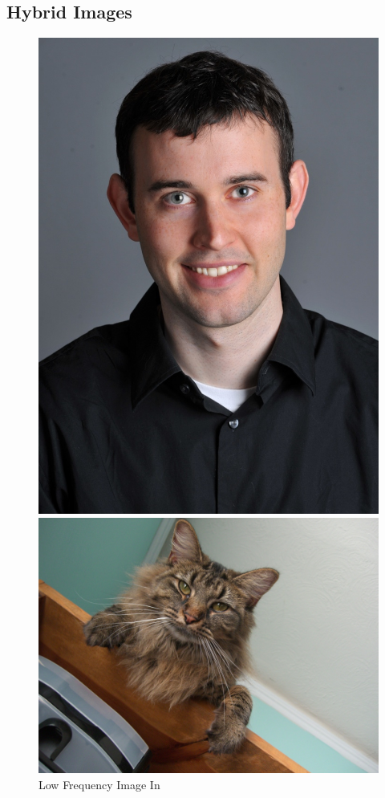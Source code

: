 \documentclass{article}
\begin{document}
\subsection{Hybrid Images}
\begin{figure}[!htb]
    \includegraphics[width=\linewidth]{DerekPicture.jpg}
    \caption{Low Frequency Image In}\label{fig:awesome_image1}
\endminipage
{}
    \includegraphics[width=\linewidth]{nutmeg.jpg}

\end{figure}
\end{document}
